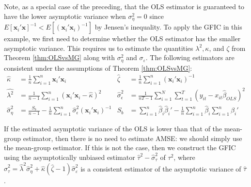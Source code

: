 Note, as a special case of the preceding, that the OLS estimator is guaranteed to have the lower asymptotic variance when $\sigma_{\eta}^2 = 0$ since $E[\mathbf{x}_i'\mathbf{x}]^{-1} < E[(\mathbf{x}_i'\mathbf{x}_i)^{-1}]$ by Jensen's inequality.
To apply the GFIC in this example, we first need to determine whether the OLS estimator has the smaller asymptotic variance.
This requires us to estimate the quantities $\lambda^2, \kappa$, and $\zeta$ from Theorem \ref{thm:OLSvsMG} along with $\sigma_{\eta}^2$ and $\sigma_{\varepsilon}$.
The following estimators are consistent under the assumptions of Theorem \ref{thm:OLSvsMG}:
\begin{align*}
  \widehat{\kappa} &= \frac{1}{n}\sum_{i=1}^n \mathbf{x}_i'\mathbf{x}_i &
  \widehat{\zeta} &= \frac{1}{n}\sum_{i=1}^n (\mathbf{x}_i'\mathbf{x}_i)^{-1} \\
  \widehat{\lambda^2} &= \frac{1}{n-1}\sum_{i=1}^n (\mathbf{x}_i'\mathbf{x}_i - \widehat{\kappa})^2  &
\widehat{\sigma}_\epsilon^2 &= \frac{1}{nT - 1} \sum_{i=1}^N \sum_{t=1}^T (y_{it}-x_{it}\widehat{\beta}_{OLS})^2\\
\widehat{\sigma}_\eta^2 &= \frac{S_b}{n-1} -\frac{1}{n} \sum_{i=1}^n \widehat{\sigma}_\epsilon^2 (\mathbf{x}_i'\mathbf{x}_i)^{-1} & 
S_b &= \sum_{i=1}^n \widehat{\beta}_i \widehat{\beta}_i' - \frac{1}{n} \sum_{i=1}^n \widehat{\beta}_i \sum_{i=1}^n \widehat{\beta}_i'
\end{align*}

If the estimated asymptotic variance of the OLS is lower than that of the mean-group estimator, then there is no need to estimate AMSE: we should simply use the mean-group estimator.
If this is not the case, then we construct the GFIC using the asymptotically unbiased estimator $\widehat{\tau}^2 - \widehat{\sigma}_\tau^2$ of $\tau^2$, where $\widehat{\sigma}_\tau^2 = \widehat{\lambda}^2 \widehat{\sigma}^2_{\eta} + \widehat{\kappa}(\widehat{\zeta} - 1) \widehat{\sigma}_{\varepsilon}^2$ is a consistent estimator of the asymptotic variance of $\widehat{\tau}$.
